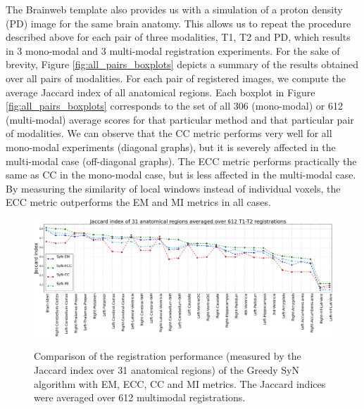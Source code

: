 The Brainweb template also provides us with a simulation of a proton density (PD) image for the same brain anatomy. This allows us to repeat the procedure described above for each pair of three modalities, T1, T2 and PD, which results in 3 mono-modal and 3 multi-modal registration experiments. For the sake of brevity, Figure \ref{fig:all_pairs_boxplots} depicts a summary of the results obtained over all pairs of modalities. For each pair of registered images, we compute the average Jaccard index of all anatomical regions. Each boxplot in Figure \ref{fig:all_pairs_boxplots} corresponds to the set of all 306 (mono-modal) or 612 (multi-modal) average scores for that particular method and that particular pair of modalities. We can observe that the CC metric performs very well for all mono-modal experiments (diagonal graphs), but it is severely affected in the multi-modal case (off-diagonal graphs). The ECC metric performs practically the same as CC in the mono-modal case, but is less affected in the multi-modal case. By measuring the similarity of local windows instead of individual voxels, the ECC metric outperforms the EM and MI metrics in all cases.

%


\begin{figure}[t!]
\centering
\includegraphics[width=1.0\linewidth]{./images/multi_lines_seg.png}\\
\caption{Comparison of the registration performance (measured by the Jaccard index over 31 anatomical regions) of the Greedy SyN algorithm with EM, ECC, CC and MI metrics. The Jaccard
indices were averaged over 612 multimodal registrations.}
\label{fig:multi_seg}
\end{figure}


